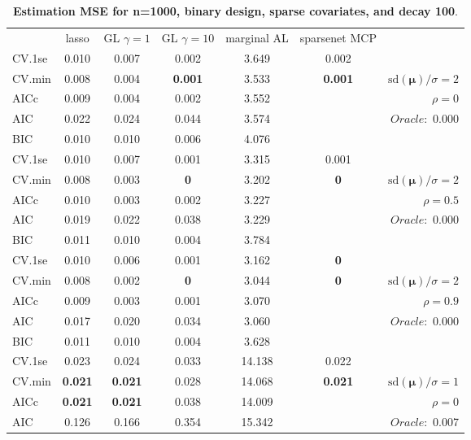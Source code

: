 \clearpage
\begin{table}\vspace{-.5cm}
\caption[l]{ { \bf Estimation MSE for n=1000, binary design, 
sparse covariates, and  decay  100}.}
\vspace{-.5cm}
\footnotesize{}
\begin{center}
\begin{tabular}{l*{5}{c}|r}
& lasso & GL $\gamma=1$ & GL $\gamma=10$ & marginal AL & sparsenet MCP  & \\
 \cline{1-7}
CV.1se & 0.010 & 0.007 & 0.002 & 3.649 & 0.002 & \\
CV.min & 0.008 & 0.004 & {\bf 0.001} & 3.533 & {\bf 0.001} &  $\mathrm{sd}(\mathbf{\mu})/\sigma=2$ \\
AICc & 0.009 & 0.004 & 0.002 & 3.552 & & $\rho=0$ \\
AIC & 0.022 & 0.024 & 0.044 & 3.574 & &  \multirow{2}{*}{$Oracle: $ 0.000} \\
BIC & 0.010 & 0.010 & 0.006 & 4.076 & &  \\
 \hline 
CV.1se & 0.010 & 0.007 & 0.001 & 3.315 & 0.001 & \\
CV.min & 0.008 & 0.003 & {\bf 0} & 3.202 & {\bf 0} &  $\mathrm{sd}(\mathbf{\mu})/\sigma=2$ \\
AICc & 0.010 & 0.003 & 0.002 & 3.227 & & $\rho=0.5$ \\
AIC & 0.019 & 0.022 & 0.038 & 3.229 & &  \multirow{2}{*}{$Oracle: $ 0.000} \\
BIC & 0.011 & 0.010 & 0.004 & 3.784 & &  \\
 \hline 
CV.1se & 0.010 & 0.006 & 0.001 & 3.162 & {\bf 0} & \\
CV.min & 0.008 & 0.002 & {\bf 0} & 3.044 & {\bf 0} &  $\mathrm{sd}(\mathbf{\mu})/\sigma=2$ \\
AICc & 0.009 & 0.003 & 0.001 & 3.070 & & $\rho=0.9$ \\
AIC & 0.017 & 0.020 & 0.034 & 3.060 & &  \multirow{2}{*}{$Oracle: $ 0.000} \\
BIC & 0.011 & 0.010 & 0.004 & 3.628 & &  \\
 \hline 
CV.1se & 0.023 & 0.024 & 0.033 & 14.138 & 0.022 & \\
CV.min & {\bf 0.021} & {\bf 0.021} & 0.028 & 14.068 & {\bf 0.021} &  $\mathrm{sd}(\mathbf{\mu})/\sigma=1$ \\
AICc & {\bf 0.021} & {\bf 0.021} & 0.038 & 14.009 & & $\rho=0$ \\
AIC & 0.126 & 0.166 & 0.354 & 15.342 & &  \multirow{2}{*}{$Oracle: $ 0.007} \\

\end{tabular}
\end{center}
\end{table}
